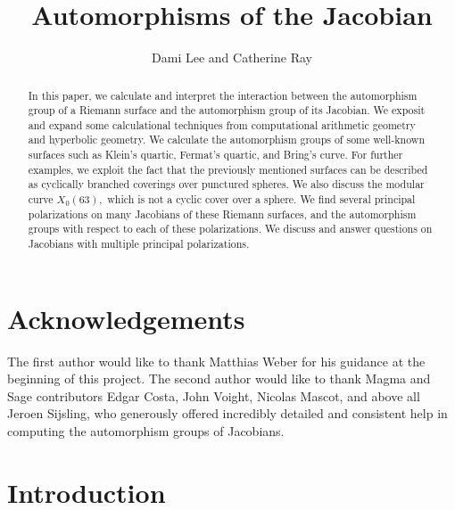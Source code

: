 \documentclass[12pt,reqno]{amsart}
\title{Automorphisms of the Jacobian}
\author{Dami Lee and Catherine Ray}
\theoremstyle{definition}
\theoremstyle{remark}
\begin{document}
	
	\maketitle
	
\begin{abstract}
In this paper, we calculate and interpret the interaction between the automorphism group of a Riemann surface and the automorphism group of its Jacobian. We exposit and expand some calculational techniques from computational arithmetic geometry and hyperbolic geometry. We calculate the automorphism groups of some well-known surfaces such as Klein's quartic, Fermat's quartic, and Bring's curve. For further examples, we exploit the fact that the previously mentioned surfaces can be described as cyclically branched coverings over punctured spheres. We also discuss the modular curve $X_0(63),$ which is not a cyclic cover over a sphere. We find several principal polarizations on many Jacobians of these Riemann surfaces, and the automorphism groups with respect to each of these polarizations. We discuss and answer questions on Jacobians with multiple principal polarizations. 

\end{abstract} 
	
	
\tableofcontents




\section*{Acknowledgements} 
The first author would like to thank Matthias Weber for his guidance at the beginning of this project. The second author would like to thank Magma and Sage contributors Edgar Costa, John Voight, Nicolas Mascot, and above all Jeroen Sijsling, who generously offered incredibly detailed and consistent help in computing the automorphism groups of Jacobians.

\section{Introduction} 

\end{document}
